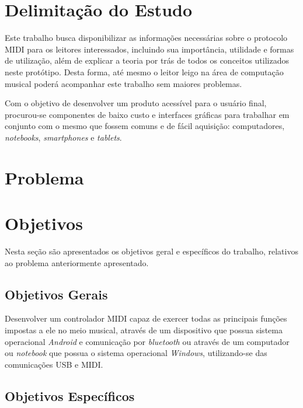     \section{Delimitação do Estudo}

        Este trabalho busca disponibilizar as informações necessárias sobre o protocolo MIDI para os leitores interessados, incluindo sua importância, utilidade e formas de utilização, além de explicar a teoria por trás de todos os conceitos utilizados neste protótipo. Desta forma, até mesmo o leitor leigo na área de computação musical poderá acompanhar este trabalho sem maiores problemas.
        
        Com o objetivo de desenvolver um produto acessível para o usuário final, procurou-se componentes de baixo custo e interfaces gráficas para trabalhar em conjunto com o mesmo que fossem comuns e de fácil aquisição: computadores, \textit{notebooks}, \textit{smartphones} e \textit{tablets}.

    \section{Problema}

        

    \section{Objetivos}

        Nesta seção são apresentados os objetivos geral e específicos do trabalho, relativos ao problema anteriormente apresentado.

        \subsection{Objetivos Gerais}

            Desenvolver um controlador MIDI capaz de exercer todas as principais funções impostas a ele no meio musical, através de um dispositivo que possua sistema operacional \textit{Android} e comunicação por \textit{bluetooth} ou através de um computador ou \textit{notebook} que possua o sistema operacional \textit{Windows}, utilizando-se das comunicações USB e MIDI.

        \subsection{Objetivos Específicos}

